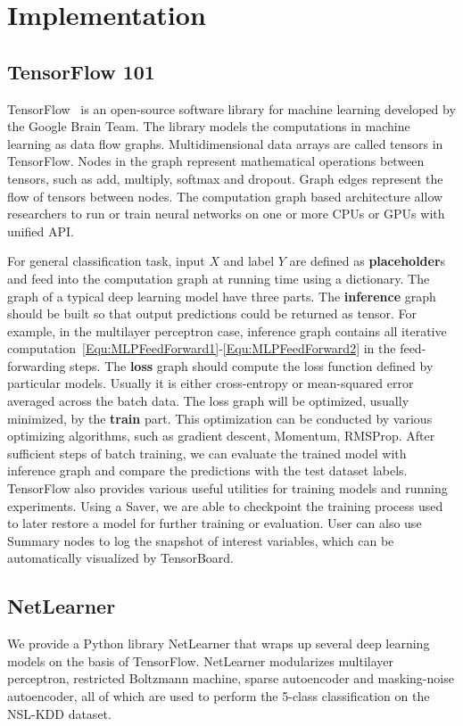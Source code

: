 \section{Implementation}

\subsection{TensorFlow 101}
TensorFlow~\cite{TensorFlow} is an open-source software library for machine learning developed by the Google Brain Team.
The library models the computations in machine learning as data flow graphs.
Multidimensional data arrays are called tensors in TensorFlow.
Nodes in the graph represent mathematical operations between tensors,
such as add, multiply, softmax and dropout.
Graph edges represent the flow of tensors between nodes.
The computation graph based architecture allow researchers to run or train neural networks
on one or more CPUs or GPUs with unified API.

For general classification task, input $X$ and label $Y$ are defined as \textbf{placeholder}s
and feed into the computation graph at running time using a dictionary.
The graph of a typical deep learning model have three parts.
The \textbf{inference} graph should be built so that output predictions could be returned as tensor.
For example, in the multilayer perceptron case, inference graph contains all iterative
computation~\ref{Equ:MLPFeedForward1}-\ref{Equ:MLPFeedForward2} in the feed-forwarding steps.
The \textbf{loss} graph should compute the loss function defined by particular models.
Usually it is either cross-entropy or mean-squared error averaged across the batch data.
The loss graph will be optimized, usually minimized, by the \textbf{train} part.
This optimization can be conducted by various optimizing algorithms, such as gradient descent,
Momentum, RMSProp.
After sufficient steps of batch training, we can evaluate the trained model with inference
graph and compare the predictions with the test dataset labels.
TensorFlow also provides various useful utilities for training models and running experiments.
Using a Saver, we are able to checkpoint the training process used to later restore a model for
further training or evaluation.
User can also use Summary nodes to log the snapshot of interest variables, which can be
automatically visualized by TensorBoard.

\subsection{NetLearner}
We provide a Python library NetLearner that wraps up several deep learning models on the basis of TensorFlow.
NetLearner modularizes multilayer perceptron, restricted Boltzmann machine, sparse autoencoder
and masking-noise autoencoder, all of which are used to perform the 5-class classification
on the NSL-KDD dataset.


